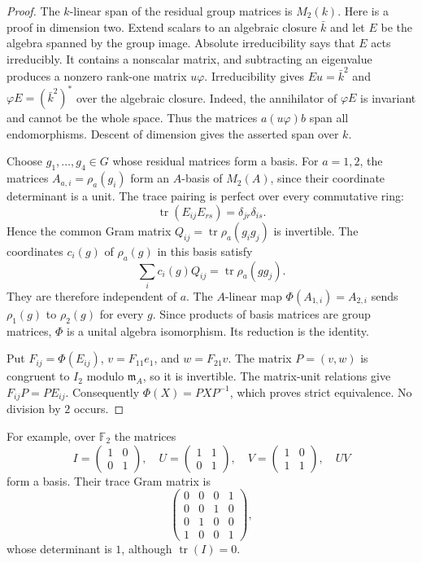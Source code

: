 \begin{proof}
The $k$-linear span of the residual group matrices is $M_2(k)$.
Here is a proof in dimension two. Extend scalars to an algebraic
closure $\bar k$ and let $E$ be the algebra spanned by the group image.
Absolute irreducibility says that $E$ acts irreducibly. It contains a
nonscalar matrix, and subtracting an eigenvalue produces a nonzero
rank-one matrix $u\varphi$. Irreducibility gives $Eu=\bar k^2$ and
$\varphi E=(\bar k^2)^*$ over the algebraic closure. Indeed, the annihilator
of $\varphi E$ is invariant and cannot be the whole space.
Thus the matrices $a(u\varphi)b$ span all endomorphisms.
Descent of dimension gives the asserted span over $k$.

Choose $g_1,\ldots,g_4\in G$ whose residual matrices form a basis.
For $a=1,2$, the matrices $A_{a,i}=\rho_a(g_i)$ form an $A$-basis of
$M_2(A)$, since their coordinate determinant is a unit.
The trace pairing is perfect over every commutative ring:
\[
 \operatorname{tr}(E_{ij}E_{rs})=\delta_{jr}\delta_{is}.
\]
Hence the common Gram matrix
$Q_{ij}=\operatorname{tr}\rho_a(g_i g_j)$ is invertible.
The coordinates $c_i(g)$ of $\rho_a(g)$ in this basis satisfy
\[
 \sum_i c_i(g)Q_{ij}=\operatorname{tr}\rho_a(gg_j).
\]
They are therefore independent of $a$.
The $A$-linear map $\Phi(A_{1,i})=A_{2,i}$ sends
$\rho_1(g)$ to $\rho_2(g)$ for every $g$.
Since products of basis matrices are group matrices, $\Phi$ is a
unital algebra isomorphism. Its reduction is the identity.

Put $F_{ij}=\Phi(E_{ij})$, $v=F_{11}e_1$, and $w=F_{21}v$.
The matrix $P=(v,w)$ is congruent to $I_2$ modulo $\mathfrak m_A$,
so it is invertible. The matrix-unit relations give
$F_{ij}P=PE_{ij}$. Consequently $\Phi(X)=PXP^{-1}$, which proves
strict equivalence. No division by $2$ occurs.
\end{proof}

For example, over $\mathbb F_2$ the matrices
\[
 I=\begin{pmatrix}1&0\\0&1\end{pmatrix},\quad
 U=\begin{pmatrix}1&1\\0&1\end{pmatrix},\quad
 V=\begin{pmatrix}1&0\\1&1\end{pmatrix},\quad UV
\]
form a basis. Their trace Gram matrix is
\[
 \begin{pmatrix}
 0&0&0&1\\0&0&1&0\\0&1&0&0\\1&0&0&1
 \end{pmatrix},
\]
whose determinant is $1$, although $\operatorname{tr}(I)=0$.

